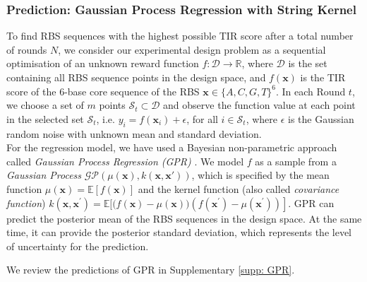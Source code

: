 \documentclass{scrartcl}[2013/05/29]%
\newcommand{\mengyan}[1]{\textcolor{magenta}{#1}}
\begin{document}
\subsubsection{Prediction: Gaussian Process Regression with String Kernel}
\label{sec: method prediction with kernel}


To find RBS sequences with the highest possible TIR score after a total number of rounds $N$, we consider our experimental design problem as a sequential optimisation of an unknown reward function $f: \mathcal{D} \rightarrow \mathbb{R}$, where $\mathcal{D}$ is the set containing all RBS sequence points in the design space, and $f(\mathbf{x})$ is the TIR score of the 6-base core sequence of the RBS $\mathbf{x} \in \{A,C,G,T\}^{6}$.
In each Round $t$, we choose a set of $m$ points $\mathcal{S}_t \subset \mathcal{D}$ and observe the function value at each point in the selected set $\mathcal{S}_t$, i.e. $y_i = f(\mathbf{x}_i) + \epsilon$, for all $i \in \mathcal{S}_t$, where $\epsilon$ is the Gaussian random noise with unknown mean and standard deviation. \\

For the regression model, we have used a Bayesian non-parametric approach called \textit{Gaussian Process Regression (GPR)} \cite{Rasmussen2004,srinivas2012information, romero_navigating_2013}.
We model $f$ as a sample from a \textit{Gaussian Process} $\mathcal{G} \mathcal{P}(\mu(\mathbf{x}), k(\mathbf{x}, \mathbf{x'}))$, which is specified by the mean function $\mu(\mathbf{x})=\mathbb{E}[f(\mathbf{x})]$ and the kernel function (also called \textit{covariance function}) $k\left(\mathbf{x}, \mathbf{x}^{\prime}\right)=\mathbb{E}[(f(\mathbf{x})-\left.\mu(\mathbf{x}))\left(f\left(\mathbf{x}^{\prime}\right)-\mu\left(\mathbf{x}^{\prime}\right)\right)\right]$.
GPR can predict the posterior mean of the RBS sequences in the design space. At the same time, it can provide the posterior standard deviation, which represents the level of uncertainty for the prediction.

We review the predictions of GPR in Supplementary \ref{supp: GPR}.\\
\end{document}
